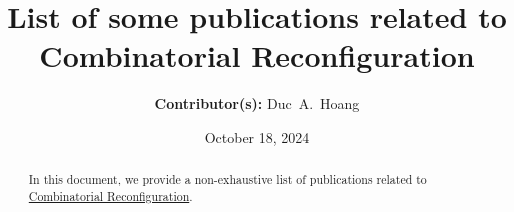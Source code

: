 \documentclass[a4paper]{article}
\title{\textbf{List of some publications related to Combinatorial Reconfiguration}}
\author{
    \textbf{Contributor(s): }%
    	Duc~A.~Hoang\\
}
\date{October 18, 2024}
\begin{document}
	\nocite{*}
	
	\maketitle
	
	\begin{abstract}
		In this document, we provide a non-exhaustive list of publications related to \href{https://en.wikipedia.org/wiki/Reconfiguration}{Combinatorial Reconfiguration}.
	\end{abstract}
	
	\tableofcontents
	
	\clearpage
	
 	\printbibbyyear
\end{document}
